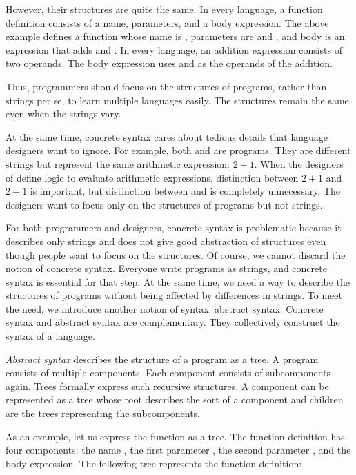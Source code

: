 However, their structures are quite the same. In every language, a
function definition consists of a name, parameters, and a body
expression. The above example defines a function whose name is ,
parameters are  and , and body is an expression that
adds  and . In every language, an addition expression
consists of two operands. The body expression uses  and 
as the operands of the addition.

Thus, programmers should focus on the structures of programs, rather
than strings per se, to learn multiple languages easily. The structures
remain the same even when the strings vary.

At the same time, concrete syntax cares about tedious details that
language designers want to ignore. For example, both  and
 are \lang programs. They are different strings but
represent the same arithmetic expression: $2+1$. When the designers of
\lang define logic to evaluate arithmetic expressions, distinction
between $2+1$ and $2-1$ is important, but distinction between
 and  is completely unnecessary. The
designers want to focus only on the structures of programs but not
strings.

For both programmers and designers, concrete syntax is problematic
because it describes only strings and does not give good abstraction of
structures even though people want to focus on the structures. Of
course, we cannot discard the notion of concrete syntax. Everyone write
programs as strings, and concrete syntax is essential for that step. At
the same time, we need a way to describe the structures of programs
without being affected by differences in strings. To meet the need, we
introduce another notion of syntax: abstract syntax. Concrete syntax and
abstract syntax are complementary. They collectively construct the
syntax of a language.

\textit{Abstract syntax} describes the structure of a program as a tree. A program
consists of multiple components. Each component consists of subcomponents again.
Trees formally express such recursive structures. A component can be represented
as a tree whose root describes the sort of a component and children are the
trees representing the subcomponents.

As an example, let us express the function  as a tree. The function
definition has four components: the name , the first parameter
, the second parameter , and the body expression. The following
tree represents the function definition:

